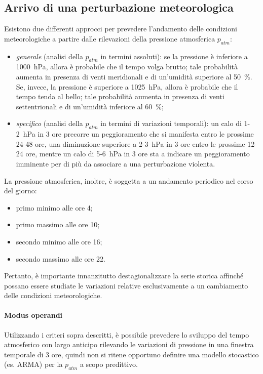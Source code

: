 \subsection{Arrivo di una perturbazione meteorologica} 
Esistono due differenti approcci per prevedere l'andamento delle condizioni meteorologiche a partire dalle rilevazioni della pressione atmosferica $p_{atm}$:
\begin{itemize}
	\item \textit{generale} (analisi della $p_{atm}$ in termini assoluti): se la pressione è inferiore a \SI{1000}{\hecto\pascal}, allora è probabile che il tempo volga brutto; tale probabilità aumenta in presenza di venti meridionali e di un'umidità superiore al \SI{50}{\percent}. Se, invece, la pressione è superiore a \SI{1025}{\hecto\pascal}, allora è probabile che il tempo tenda al bello; tale probabilità aumenta in presenza di venti settentrionali e di un'umidità inferiore al \SI{60}{\percent};
	\item \textit{specifico} (analisi della $p_{atm}$ in termini di variazioni temporali): un calo di 1-\SI{2}{\hecto\pascal} in 3 ore precorre un peggioramento che si manifesta entro le prossime 24-48 ore, una diminuzione superiore a 2-\SI{3}{\hecto\pascal} in 3 ore entro le prossime 12-24 ore, mentre un calo di 5-\SI{6}{\hecto\pascal} in 3 ore sta a indicare un peggioramento imminente per di più da associare a una perturbazione violenta. 
\end{itemize}
La pressione atmosferica, inoltre, è soggetta a un andamento periodico nel corso del giorno:
\begin{itemize}
	\item primo minimo alle ore 4;
	\item primo massimo alle ore 10;
	\item secondo minimo alle ore 16;
	\item secondo massimo alle ore 22.
\end{itemize}
Pertanto, è importante innanzitutto destagionalizzare la serie storica affinché possano essere studiate le variazioni relative esclusivamente a un cambiamento delle condizioni meteorologiche.

\paragraph{Modus operandi} Utilizzando i criteri sopra descritti, è possibile prevedere lo sviluppo del tempo atmosferico con largo anticipo rilevando le variazioni di pressione in una finestra temporale di 3 ore, quindi non si ritene opportuno definire una modello stocastico (es. ARMA) per la $p_{atm}$ a scopo predittivo.

